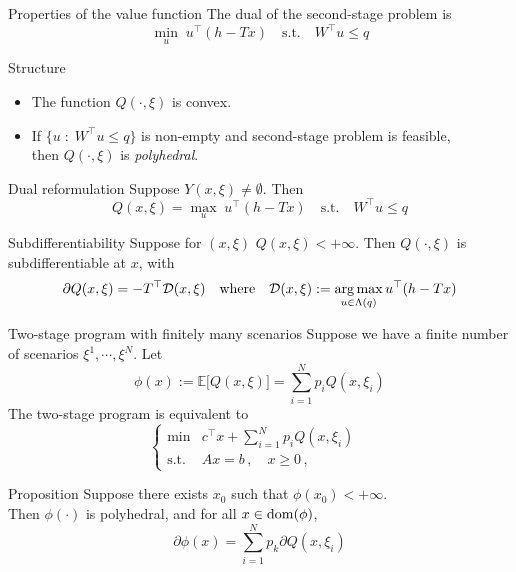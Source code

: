 \begin{frame}{Properties of the value function}
  The dual of the second-stage problem is
  \begin{equation*}
      \min_{u} \; u^\top (h - Tx) \quad \text{s.t.} \quad W^\top u \leq q
  \end{equation*}

  \begin{block}{Structure}
    \begin{itemize}
      \item The function $Q(\cdot, \xi)$ is convex.
      \item If $\{u \; : \; W^\top u \leq q \}$
        is non-empty and second-stage problem is feasible,\\
        then $Q(\cdot, \xi)$ is \emph{polyhedral}.
    \end{itemize}
  \end{block}

  \begin{block}{Dual reformulation}
    Suppose $Y(x, \xi) \neq \emptyset$. Then
    \begin{equation*}
      Q(x, \xi) = \max_{u} \; u^\top (h - Tx) \quad \text{s.t.} \quad W^\top u \leq q
    \end{equation*}
  \end{block}

  \begin{block}{Subdifferentiability}
    Suppose for $(x, \xi)$ $Q(x, \xi) < +\infty$. Then $Q(\cdot, \xi)$ is subdifferentiable
    at $x$, with
    \begin{equation*}
      \partial Q(x, \xi) = -T^\top \mathcal{D}(x, \xi) \quad
      \text{where} \quad
      \mathcal{D}(x, \xi) := \mathop{\rm arg\,max}_{u \in \Lambda(q)} u^\top (h - Tx)
    \end{equation*}
  \end{block}
\end{frame}

\begin{frame}{Two-stage program with finitely many scenarios}
  Suppose we have a finite number of scenarios $\xi^1, \cdots, \xi^N$.
  Let
  \begin{equation*}
    \phi(x) := \mathbb{E}\big[ Q(x, \xi) \big] = \sum_{i=1}^N p_i Q(x, \xi_i)
  \end{equation*}
  The two-stage program is equivalent to
  \[
    \left\{ \begin{array}{rll}
        \min & c^\top x +\sum_{i=1}^N p_i Q(x,\xi_i) &\\
  \mbox{s.t.} & Ax=b\,, \quad x\geq0\,,&
  \end{array} \right.
  \]

  \begin{block}{Proposition}
    Suppose there exists $x_0$ such that $\phi(x_0) < +\infty$.\\
    Then $\phi(\cdot)$ is polyhedral, and for all $x \in \operatorname{dom}(\phi)$,
    \begin{equation*}
      \partial \phi(x) = \sum_{i=1}^N p_k \partial Q(x, \xi_i)
    \end{equation*}
  \end{block}
\end{frame}



